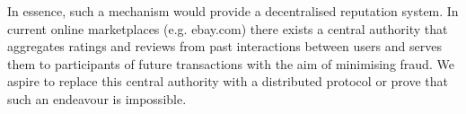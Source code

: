   In essence, such a mechanism would provide a decentralised reputation system. In current
  online marketplaces (e.g. ebay.com) there exists a central authority that aggregates
  ratings and reviews from past interactions between users and serves them to participants
  of future transactions with the aim of minimising fraud. We aspire to replace this
  central authority with a distributed protocol or prove that such an endeavour is
  impossible.
